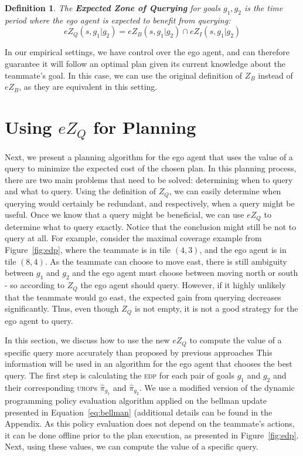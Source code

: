 \documentclass[letterpaper]{article}
\newtheorem{definition}{Definition}
\begin{document}
\begin{definition}
The \textbf{Expected Zone of Querying}  for goals $g_1, g_2$ is the time period where the ego agent is expected to benefit from querying:
\begin{equation*}
eZ_Q(s, g_1 | g_2) = eZ_B(s, g_1 | g_2) \cap eZ_I(s, g_1 | g_2)
\end{equation*}
\end{definition}
In our empirical settings, we have control over the ego agent, and can therefore guarantee it will follow an optimal plan given its current knowledge about the teammate's goal. In this case, we can use the original definition of $Z_B$ instead of $eZ_B$, as they are equivalent in this setting.

\section{Using $eZ_Q$ for Planning}
\label{sec:alg}
Next, we present a planning algorithm for the ego agent that uses the value of a query to minimize the expected cost of the chosen plan. In this planning process, there are two main problems that need to be solved: determining when to query and what to query. Using the definition of $Z_Q$, we can easily determine when querying would certainly be redundant, and respectively, when a query might be useful. Once we know that a query might be beneficial, we can use $eZ_Q$ to determine what to query exactly. Notice that the conclusion might still be not to query at all. For example, consider the maximal coverage example from Figure~\ref{fig:edp}, where the teammate is in tile $(4,3)$, and the ego agent is in tile $(8,4)$. As the teammate can choose to move east, there is still ambiguity between $g_1$ and $g_2$ and the ego agent must choose between moving north or south - so according to $Z_Q$ the ego agent should query. However, if it highly unlikely that the teammate would go east, the expected gain from querying decreases significantly. Thus, even though $Z_Q$ is not empty, it is not a good strategy for the ego agent to query. %

In this section, we discuss how to use the new $eZ_Q$ to compute the value of a specific query more accurately than proposed by previous approaches
This information will be used in an algorithm for the ego agent that chooses the best query. %
The first step is calculating the \textsc{edp} for each pair of goals $g_1$ and $g_2$ and their corresponding \textsc{urop}s $\hat{\pi}_{g_1}$ and $\hat{\pi}_{g_2}$. %
We use a modified version of the dynamic programming policy evaluation algorithm \cite{bellman1966dynamic} applied on the bellman update presented in Equation~\ref{eq:bellman} (additional details can be found in the Appendix.
As this policy evaluation does not depend on the teammate's actions, it can be done offline prior to the plan execution, as presented in Figure~\ref{fig:edp}. Next, using these values, we can compute the value of a specific query.
\end{document}

